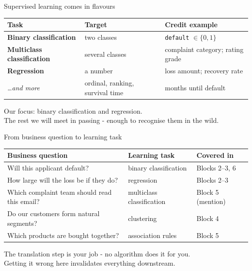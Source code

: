 \documentclass[10pt,aspectratio=169]{beamer}
\begin{document}
\begin{frame}{Supervised learning comes in flavours}
  \small
  \begin{center}
  \begin{tabular}{@{}lp{4.2cm}p{4.6cm}@{}}
    \toprule
    Task & Target & Credit example \\
    \midrule
    \textbf{Binary classification} & two classes & \texttt{default} $\in \{0,1\}$ \\
    \textbf{Multiclass classification} & several classes & complaint category; rating grade \\
    \textbf{Regression} & a number & loss amount; recovery rate \\
    \emph{\ldots and more} & ordinal, ranking, survival time & months until default \\
    \bottomrule
  \end{tabular}
  \end{center}
  \vspace{0.7em}
  \begin{center}
    Our focus: \alert{binary classification} and \alert{regression}.\\
    The rest we will meet in passing - enough to recognise them in the wild.
  \end{center}
\end{frame}

\begin{frame}{From business question to learning task}
  \small
  \begin{center}
  \begin{tabular}{@{}p{5.6cm}p{3.4cm}p{3.4cm}@{}}
    \toprule
    Business question & Learning task & Covered in \\
    \midrule
    Will this applicant default? & binary classification & Blocks 2--3, 6 \\
    How large will the loss be if they do? & regression & Blocks 2--3 \\
    Which complaint team should read this email? & multiclass classification & Block 5 (mention) \\
    Do our customers form natural segments? & clustering & Block 4 \\
    Which products are bought together? & association rules & Block 5 \\
    \bottomrule
  \end{tabular}
  \end{center}
  \vspace{0.6em}
  \begin{center}
    The translation step is \alert{your} job - no algorithm does it for you.\\
    \small Getting it wrong here invalidates everything downstream.
  \end{center}
\end{frame}
\end{document}
